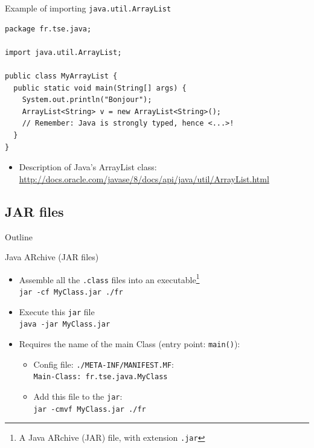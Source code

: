 \documentclass[English,c,%
hyperref={%
    pdftitle={FISA-DE2 OOP in Java},%
    pdfauthor={Muller, Gravier, Laforest, Subercaze},%
    pdfsubject={OOP in Java},%
    pdfkeywords={OOP, Java},%
    colorlinks=true,%
    urlcolor=blue,%
    linkcolor=%
    },%
xcolor={pdftex,svgnames} %
]{beamer}
\begin{document}
\begin{frame}[fragile]{Example of importing \lstinline{java.util.ArrayList}}

\begin{lstlisting}[escapechar=\%,label=myarraylistpackage,caption=MyArrayList.java]
package fr.tse.java;

import java.util.ArrayList;

public class MyArrayList {
  public static void main(String[] args) {
    System.out.println("Bonjour");
    ArrayList<String> v = new ArrayList<String>();
    // Remember: Java is strongly typed, hence <...>!
  }
}
\end{lstlisting}

  \bigskip
\begin{itemize}
  \item Description of Java's ArrayList class:\\
  \url{http://docs.oracle.com/javase/8/docs/api/java/util/ArrayList.html}
\end{itemize}

\end{frame}


\subsection{JAR files}
   \begin{frame}{Outline}
       \tableofcontents[currentsubsection]
   \end{frame}

\begin{frame}{Java ARchive (JAR files)}
\begin{itemize}
    \item Assemble all the \texttt{.class} files into an executable\footnote{A Java ARchive (JAR) file, with extension \texttt{.jar}}\\
    \texttt{jar -cf MyClass.jar ./fr}
    \pause
    \medskip
    \item Execute this \texttt{jar} file\\
    \texttt{java -jar MyClass.jar}
    \pause
    \medskip
    \item Requires the name of the main Class (entry point: \lstinline{main()}):
    \begin{itemize}
      \item Config file: \texttt{./META-INF/MANIFEST.MF}:\\
      \texttt{Main-Class: fr.tse.java.MyClass}
      \item Add this file to the \texttt{jar}:\\
      \texttt{jar -cmvf MyClass.jar ./fr}
    \end{itemize}
\end{itemize}
\end{frame}
\end{document}
